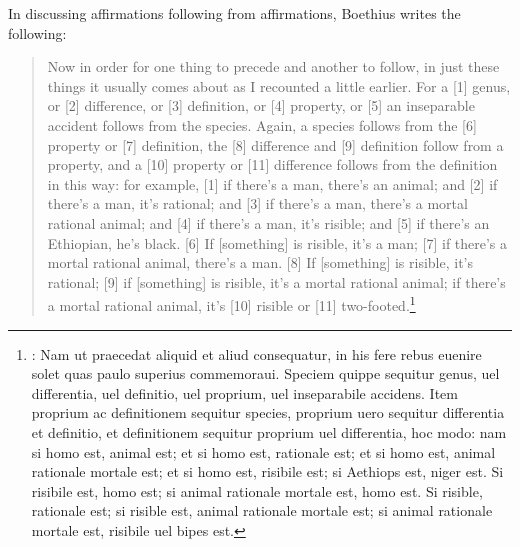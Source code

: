 \documentclass[a4paper, 11pt]{article}
\begin{document}
In discussing affirmations following from affirmations, Boethius writes the following:
\begin{quote}
Now in order for one thing to precede and another to follow, in just these things it usually comes about as I recounted a little earlier. For a [1] genus, or [2] difference, or [3] definition, or [4] property, or [5] an inseparable accident follows from the species. Again, a species follows from the [6] property or [7] definition, the [8] difference and [9] definition follow from a property, and a [10] property or [11] difference follows from the definition in this way: for example, [1] if there's a man, there's an animal; and [2] if there's a man, it's rational; and [3] if there's a man, there's a mortal rational animal; and [4] if there's a man, it's risible; and [5] if there's an Ethiopian, he's black. [6] If [something] is risible, it's a man; [7] if there's a mortal rational animal, there's a man. [8] If [something] is risible, it's rational; [9] if [something] is risible, it's a mortal rational animal; if there's a mortal rational animal, it's [10] risible or [11] two-footed.\footnote{\autocite[1179A-B]{BDT}: Nam ut praecedat aliquid et aliud consequatur, in his fere rebus euenire solet quas paulo superius commemoraui. Speciem quippe sequitur genus, uel differentia, uel definitio, uel proprium, uel inseparabile accidens. Item proprium ac definitionem sequitur species, proprium uero sequitur differentia et definitio, et definitionem sequitur proprium uel differentia, hoc modo: nam si homo est, animal est; et si homo est, rationale est; et si homo est, animal rationale mortale est; et si homo est, risibile est; si Aethiops est, niger est. Si risibile est, homo est; si animal rationale mortale est, homo est. Si risible, rationale est; si risible est, animal rationale mortale est; si animal rationale mortale est, risibile uel bipes est.}
\end{quote}
\end{document}
